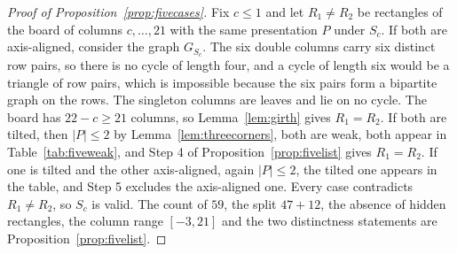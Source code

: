 \begin{proof}[Proof of Proposition~\ref{prop:fivecases}]
Fix $c\le1$ and let $R_1\ne R_2$ be rectangles of the board of columns $c,\dots,21$ with the
same presentation $P$ under $S_c$. If both are axis-aligned, consider the graph $G_{S_c}$. The
six double columns carry six distinct row pairs, so there is no cycle of length four, and a
cycle of length six would be a triangle of row pairs, which is impossible because the six
pairs form a bipartite graph on the rows. The singleton columns are leaves and lie on no cycle.
The board has $22-c\ge21$ columns, so Lemma~\ref{lem:girth} gives $R_1=R_2$. If both are
tilted, then $|P|\le2$ by Lemma~\ref{lem:threecorners}, both are weak, both appear in
Table~\ref{tab:fiveweak}, and Step 4 of Proposition~\ref{prop:fivelist} gives $R_1=R_2$. If one
is tilted and the other axis-aligned, again $|P|\le2$, the tilted one appears in the table, and
Step 5 excludes the axis-aligned one. Every case contradicts $R_1\ne R_2$, so $S_c$ is valid.
The count of $59$, the split $47+12$, the absence of hidden rectangles, the column range
$[-3,21]$ and the two distinctness statements are Proposition~\ref{prop:fivelist}.
\end{proof}
